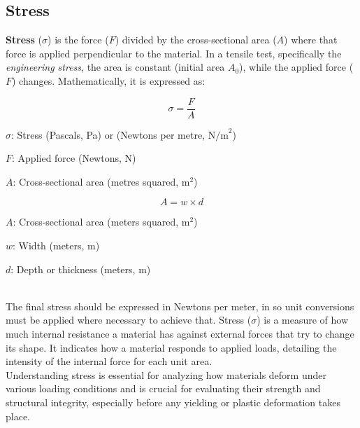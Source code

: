 \documentclass{article}
\newcommand{\wm}[1]{%
    \begin{minipage}{1\textwidth}
        #1
    \end{minipage}%
}
\begin{document}
     \subsection{Stress}
     \textbf{Stress} ($\sigma$) is the force (\(F\)) divided by the cross-sectional area (\(A\)) where that force is applied perpendicular to the material. In a tensile test, specifically the \textit{engineering stress}, the area is constant (initial area $A_0$), while the applied force ($F$) changes. Mathematically, it is expressed as:\\[8pt]
    \begin{minipage}{0.46\textwidth}
            \begin{equation}
                \sigma = \frac{F}{A}
                \label{eq:stress}
            \end{equation}
            \begin{itemize}[left=0pt,itemsep=-1mm]
            \wm{\item \(\sigma\): Stress (Pascals, Pa) or (Newtons per metre, \(\text{N/m}^2\))}
            \wm{\item \(F\): Applied force (Newtons, N)}
            \wm{\item \(A\): Cross-sectional area (metres squared, \(\text{m}^2\))}
            \end{itemize}
        \end{minipage}\hfill
        \begin{minipage}{0.47\textwidth}
            \begin{equation}
                A = w \times d
                \label{eq:csa}
            \end{equation}
            \begin{itemize}[left=0pt,itemsep=-1mm]
                \wm{\item \(A\): Cross-sectional area (meters squared, \(\text{m}^2\))}
                \wm{\item \(w\): Width (meters, \(\text{m}\))}
                \wm{\item \(d\): Depth or thickness (meters, \(\text{m}\))}            
            \end{itemize}
        \end{minipage}\\[8pt]
        The final stress should be expressed in Newtons per meter, in so unit conversions must be applied where necessary to achieve that.
        \newpage
        Stress ($\sigma$) is a measure of how much internal resistance a material has against external forces that try to change its shape. It indicates how a material responds to applied loads, detailing the intensity of the internal force for each unit area.\\[8pt]
        Understanding stress is essential for analyzing how materials deform under various loading conditions and is crucial for evaluating their strength and structural integrity, especially before any yielding or plastic deformation takes place.        
\end{document}
